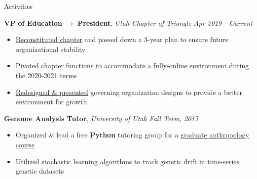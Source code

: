 \documentclass{resume/resume}
\begin{document}
\begin{rSection}{Activities}

    {\bf VP of Education} $\rightarrow$ {\bf President}, {\em Utah Chapter of Triangle \hfill Apr 2019 - Current}
    \vspace{-6pt}
    \begin{itemize}[nosep]
        \item \href{https://github.com/UtahTriangle/Laws}{Reconstituted chapter} and passed down a 3-year plan to ensure future organizational stability
        \item Pivoted chapter functions to accommodate a fully-online environment during the 2020-2021 terms
        \item \href{https://github.com/UtahTriangle/Laws/raw/main/Proposals/IGC/The\%20Independent\%20Greek\%20Council.pdf}{Redesigned \& presented} governing organization designs to provide a better environment for growth
    \end{itemize}
    
    
    
    {\bf Genome Analysis Tutor}, {\em University of Utah \hfill Fall Term, 2017}
    \vspace{-6pt}
    \begin{itemize}[nosep]
      \item Organized \& lead a free {\bf Python} tutoring group for a \href{http://content.csbs.utah.edu/~rogers/ant5221/lab/manual.pdf}{graduate anthropology course}
      \item Utilized stochastic learning algorithms to track genetic drift in time-series genetic datasets
    \end{itemize}

\end{rSection}
\end{document}
